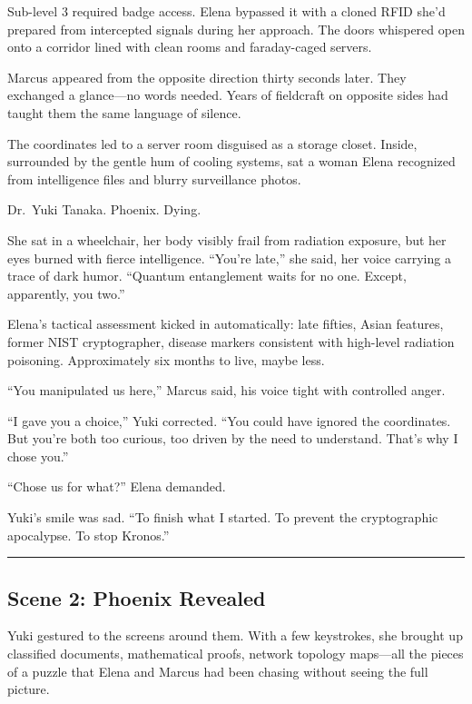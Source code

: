 \documentclass[12pt,letterpaper]{book}
\begin{document}
Sub-level 3 required badge access. Elena bypassed it with a cloned RFID she'd prepared from intercepted signals during her approach. The doors whispered open onto a corridor lined with clean rooms and faraday-caged servers.

Marcus appeared from the opposite direction thirty seconds later. They exchanged a glance---no words needed. Years of fieldcraft on opposite sides had taught them the same language of silence.

The coordinates led to a server room disguised as a storage closet. Inside, surrounded by the gentle hum of cooling systems, sat a woman Elena recognized from intelligence files and blurry surveillance photos.

Dr.~Yuki Tanaka. Phoenix. Dying.

She sat in a wheelchair, her body visibly frail from radiation exposure, but her eyes burned with fierce intelligence. ``You're late,'' she said, her voice carrying a trace of dark humor. ``Quantum entanglement waits for no one. Except, apparently, you two.''

Elena's tactical assessment kicked in automatically: late fifties, Asian features, former NIST cryptographer, disease markers consistent with high-level radiation poisoning. Approximately six months to live, maybe less.

``You manipulated us here,'' Marcus said, his voice tight with controlled anger.

``I gave you a choice,'' Yuki corrected. ``You could have ignored the coordinates. But you're both too curious, too driven by the need to understand. That's why I chose you.''

``Chose us for what?'' Elena demanded.

Yuki's smile was sad. ``To finish what I started. To prevent the cryptographic apocalypse. To stop Kronos.''

\begin{center}\rule{0.5\linewidth}{0.5pt}\end{center}

\hypertarget{scene-2-phoenix-revealed}{%
\subsection{Scene 2: Phoenix Revealed}\label{scene-2-phoenix-revealed}}

Yuki gestured to the screens around them. With a few keystrokes, she brought up classified documents, mathematical proofs, network topology maps---all the pieces of a puzzle that Elena and Marcus had been chasing without seeing the full picture.
\end{document}
